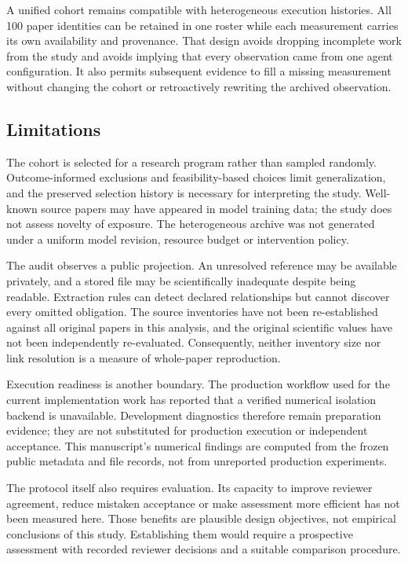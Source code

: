 \documentclass[10pt,a4paper]{article}
\begin{document}
A unified cohort remains compatible with heterogeneous execution
histories. All 100 paper identities can be retained in one roster while
each measurement carries its own availability and provenance. That
design avoids dropping incomplete work from the study and avoids
implying that every observation came from one agent configuration. It
also permits subsequent evidence to fill a missing measurement without
changing the cohort or retroactively rewriting the archived observation.

\subsection{Limitations}\label{limitations}

The cohort is selected for a research program rather than sampled
randomly. Outcome-informed exclusions and feasibility-based choices
limit generalization, and the preserved selection history is necessary
for interpreting the study. Well-known source papers may have appeared
in model training data; the study does not assess novelty of exposure.
The heterogeneous archive was not generated under a uniform model
revision, resource budget or intervention policy.

The audit observes a public projection. An unresolved reference may be
available privately, and a stored file may be scientifically inadequate
despite being readable. Extraction rules can detect declared
relationships but cannot discover every omitted obligation. The source
inventories have not been re-established against all original papers in
this analysis, and the original scientific values have not been
independently re-evaluated. Consequently, neither inventory size nor
link resolution is a measure of whole-paper reproduction.

Execution readiness is another boundary. The production workflow used
for the current implementation work has reported that a verified
numerical isolation backend is unavailable. Development diagnostics
therefore remain preparation evidence; they are not substituted for
production execution or independent acceptance. This manuscript's
numerical findings are computed from the frozen public metadata and file
records, not from unreported production experiments.

The protocol itself also requires evaluation. Its capacity to improve
reviewer agreement, reduce mistaken acceptance or make assessment more
efficient has not been measured here. Those benefits are plausible
design objectives, not empirical conclusions of this study. Establishing
them would require a prospective assessment with recorded reviewer
decisions and a suitable comparison procedure.
\end{document}
